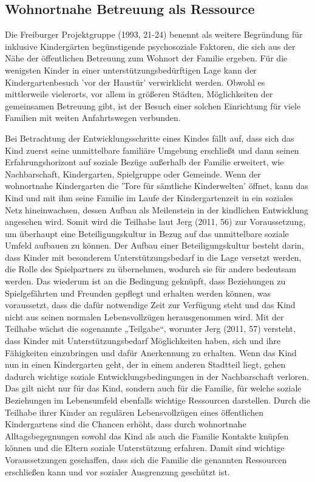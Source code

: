 \subsection{Wohnortnahe Betreuung als Ressource}
Die Freiburger Projektgruppe (1993, 21-24) benennt als weitere Begründung für inklusive Kindergärten begünstigende psychosoziale Faktoren, die sich aus der Nähe der öffentlichen Betreuung zum Wohnort der Familie ergeben. Für die wenigsten Kinder in einer unterstützungsbedürftigen Lage kann der Kindergartenbesuch 'vor der Haustür' verwirklicht werden. Obwohl es mittlerweile vielerorts, vor allem in größeren Städten, Möglichkeiten der gemeinsamen Betreuung gibt, ist der Besuch einer solchen Einrichtung für viele Familien mit weiten Anfahrtswegen verbunden. 

Bei Betrachtung der Entwicklungsschritte eines Kindes fällt auf, dass sich das Kind zuerst seine unmittelbare familiäre Umgebung erschließt und dann seinen Erfahrungshorizont auf soziale Bezüge außerhalb der Familie erweitert, wie Nachbarschaft, Kindergarten, Spielgruppe oder Gemeinde. Wenn der wohnortnahe Kindergarten die 'Tore für sämtliche Kinderwelten' öffnet, kann das Kind und mit ihm seine Familie im Laufe der Kindergartenzeit in ein soziales Netz hineinwachsen, dessen Aufbau als Meilenstein in der kindlichen Entwicklung angesehen wird. 
Somit wird die Teilhabe laut Jerg (2011, 56) zur Voraussetzung, um überhaupt eine Beteiligungskultur in Bezug auf das unmittelbare soziale Umfeld aufbauen zu können. Der Aufbau einer Beteiligungskultur besteht darin, dass Kinder mit besonderem Unterstützungsbedarf in die Lage versetzt werden, die Rolle des Spielpartners zu übernehmen, wodurch sie für andere bedeutsam werden. Das wiederum ist an die Bedingung geknüpft, dass Beziehungen zu Spielgefährten und Freunden gepflegt und erhalten werden können, was voraussetzt, dass die dafür notwendige Zeit zur Verfügung steht und das Kind nicht aus seinen normalen Lebensvollzügen herausgenommen wird.
Mit der Teilhabe wächst die sogenannte „Teilgabe“, worunter Jerg (2011, 57) versteht, dass Kinder mit Unterstützungsbedarf Möglichkeiten haben, sich und ihre Fähigkeiten einzubringen und dafür Anerkennung zu erhalten. 
Wenn das Kind nun in einen Kindergarten geht, der in einem anderen Stadtteil liegt, gehen dadurch wichtige soziale Entwicklungsbedingungen in der Nachbarschaft verloren. Das gilt nicht nur für das Kind, sondern auch für die Familie, für welche soziale Beziehungen im Lebensumfeld ebenfalls wichtige Ressourcen darstellen. Durch die Teilhabe ihrer Kinder an regulären Lebensvollzügen eines öffentlichen Kindergartens sind die Chancen erhöht, dass durch wohnortnahe Alltagsbegegnungen sowohl das Kind als auch die Familie Kontakte knüpfen können und die Eltern soziale Unterstützung erfahren. Damit sind wichtige Voraussetzungen geschaffen, dass sich die Familie die genannten Ressourcen erschließen kann und vor sozialer Ausgrenzung geschützt ist. 

